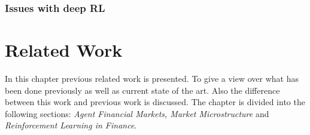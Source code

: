 \documentclass{kththesis}
\theoremstyle{definition}
\begin{document}
\subsection{Issues with deep RL}





\chapter{Related Work}
In this chapter previous related work is presented. To give a view over what has been done previously as well as current state of the art. Also the difference between this work and previous work is discussed. The chapter is divided into the following sections: \textit{Agent Financial Markets, Market Microstructure} and \textit{Reinforcement Learning in Finance}.
\end{document}
